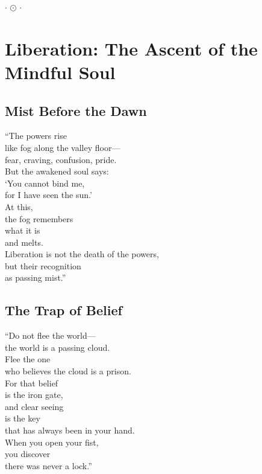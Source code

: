 \documentclass[10pt, openright]{book}
\newcommand{\sectionbreak}{\filbreak}
\newcommand{\ornament}{
    \vspace{1.5cm}
    \begin{center}
        \large \(\cdot\) \(\odot\) \(\cdot\)
    \end{center}
    \vspace{1.5cm}
}
\begin{document}
\ornament

\chapter{Liberation: The Ascent of the Mindful
Soul}\label{liberation-the-ascent-of-the-mindful-soul}

\sectionbreak

\section{Mist Before the Dawn}\label{mist-before-the-dawn}

``The powers rise\\
like fog along the valley floor---\\
fear, craving, confusion, pride.\\
But the awakened soul says:\\
`You cannot bind me,\\
for I have seen the sun.'\\
At this,\\
the fog remembers\\
what it is\\
and melts.\\
Liberation is not the death of the powers,\\
but their recognition\\
as passing mist.''

\sectionbreak

\section{The Trap of Belief}\label{the-trap-of-belief}

``Do not flee the world---\\
the world is a passing cloud.\\
Flee the one\\
who believes the cloud is a prison.\\
For that belief\\
is the iron gate,\\
and clear seeing\\
is the key\\
that has always been in your hand.\\
When you open your fist,\\
you discover\\
there was never a lock.''

\sectionbreak
\end{document}
